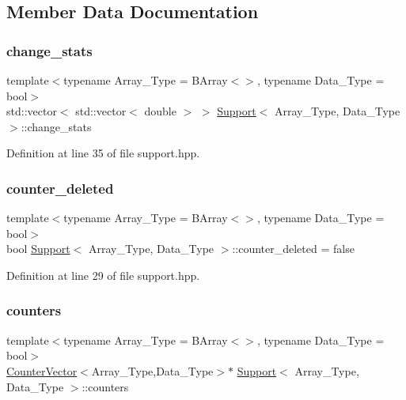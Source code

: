 \subsection{Member Data Documentation}
\mbox{\label{class_support_ae6e6f53f963c1be75bea0ee9896d1afe}} 
\subsubsection{\texorpdfstring{change\+\_\+stats}{change\_stats}}
{\footnotesize\ttfamily template$<$typename Array\+\_\+\+Type = B\+Array$<$$>$, typename Data\+\_\+\+Type = bool$>$ \\
std\+::vector$<$ std\+::vector$<$ double $>$ $>$ \hyperlink{class_support}{Support}$<$ Array\+\_\+\+Type, Data\+\_\+\+Type $>$\+::change\+\_\+stats}



Definition at line 35 of file support.\+hpp.

\mbox{\label{class_support_acb3f9a11e2c64bdea950174f7c133536}} 
\subsubsection{\texorpdfstring{counter\+\_\+deleted}{counter\_deleted}}
{\footnotesize\ttfamily template$<$typename Array\+\_\+\+Type = B\+Array$<$$>$, typename Data\+\_\+\+Type = bool$>$ \\
bool \hyperlink{class_support}{Support}$<$ Array\+\_\+\+Type, Data\+\_\+\+Type $>$\+::counter\+\_\+deleted = false}



Definition at line 29 of file support.\+hpp.

\mbox{\label{class_support_a17bd2a9dca9bf7a167a47f4c8676183a}} 
\subsubsection{\texorpdfstring{counters}{counters}}
{\footnotesize\ttfamily template$<$typename Array\+\_\+\+Type = B\+Array$<$$>$, typename Data\+\_\+\+Type = bool$>$ \\
\hyperlink{class_counter_vector}{Counter\+Vector}$<$Array\+\_\+\+Type,Data\+\_\+\+Type$>$$\ast$ \hyperlink{class_support}{Support}$<$ Array\+\_\+\+Type, Data\+\_\+\+Type $>$\+::counters}



